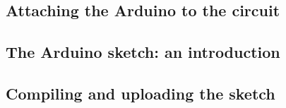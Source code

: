 \subsection{Attaching the Arduino to the circuit}

\subsection{The Arduino sketch: an introduction}

\subsection{Compiling and uploading the sketch}





